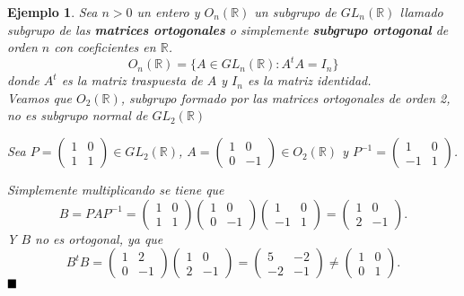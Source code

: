 \documentclass[12pt]{article}
\newtheorem{example}{Ejemplo}[theorem]
\begin{document}
\begin{example} Sea $n>0$ un entero y $O_{n}(\mathbb{R})$ un subgrupo de $GL_{n}(\mathbb{R})$ llamado subgrupo de las \textbf{matrices ortogonales} o simplemente \textbf{subgrupo ortogonal} de orden $n$ con coeficientes en $\mathbb{R}$. $$O_{n}(\mathbb{R}) = \lbrace A \in GL_{n}(\mathbb{R}):A^{t}A = I_{n}\rbrace$$ donde $A^{t}$ es la matriz traspuesta de $A$ y $I_{n}$ es la matriz identidad.\vspace{0.2cm}\\
Veamos que $O_{2}(\mathbb{R})$, subgrupo formado por las matrices ortogonales de orden 2, no es subgrupo normal de $GL_{2}(\mathbb{R})$
\begin{center}
Sea $P = \left(
\begin{matrix}
1 & 0 \\
1 & 1
\end{matrix}
\right) \in GL_{2}(\mathbb{R})$, \hspace{0.1cm} $A =\left(
\begin{matrix}
1 & 0 \\
0 & -1
\end{matrix}
\right) \in O_{2}(\mathbb{R})$ y \hspace{0.1cm }$P^{-1} = \left(
\begin{matrix}
1 & 0 \\
-1 & 1
\end{matrix}
\right)$.\\
\end{center}
Simplemente multiplicando se tiene que $$B = PAP^{-1} = \left(
\begin{matrix}
1 & 0 \\
1 & 1
\end{matrix}
\right) \left(
\begin{matrix}
1 & 0 \\
0 & -1
\end{matrix}
\right)\left(
\begin{matrix}
1 & 0 \\
-1 & 1
\end{matrix}
\right) = \left(
\begin{matrix}
1 & 0 \\
2 & -1
\end{matrix}
\right).$$
Y $B$ no es ortogonal, ya que $$B^{t}B = \left(
\begin{matrix}
1 & 2 \\
0 & -1
\end{matrix}
\right)\left(
\begin{matrix}
1 & 0 \\
2 & -1
\end{matrix}
\right)= \left(
\begin{matrix}
5 & -2 \\
-2 & -1
\end{matrix}
\right) \neq \left(
\begin{matrix}
1 & 0 \\
0 & 1
\end{matrix}
\right).$$
$\hfill \blacksquare$
\end{example}
\end{document}
